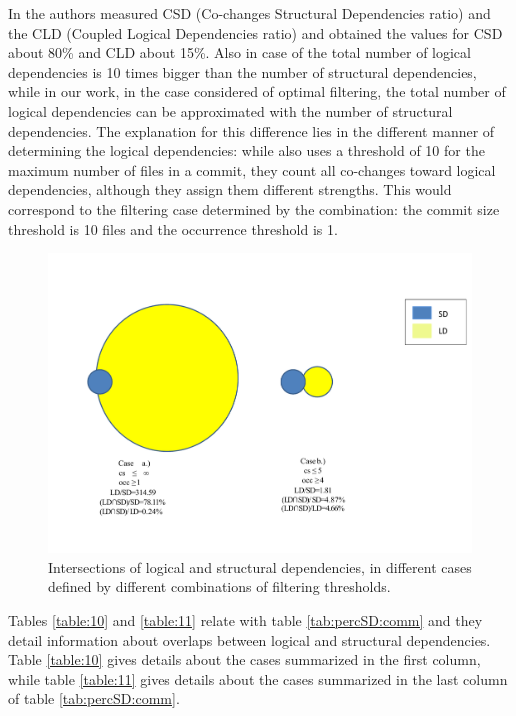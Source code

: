 \documentclass[a4paper,twoside]{article}
\begin{document}
In \cite{DBLP:journals/jss/AjienkaC17} the authors  measured CSD (Co-changes Structural Dependencies ratio) and the CLD (Coupled Logical Dependencies ratio) and obtained the values for CSD about 80\% and CLD about 15\%.  Also in case of \cite{DBLP:journals/jss/AjienkaC17}  the total number of logical dependencies is 10 times bigger than the number of structural dependencies, while in our work, in the case considered of optimal filtering,  the total number of logical dependencies can be approximated with the number of structural dependencies. The explanation for this difference lies in the different manner of determining the logical dependencies: while \cite{DBLP:journals/jss/AjienkaC17} also uses a threshold of 10 for the maximum number of files in a commit, they count all co-changes toward logical dependencies, although they assign them different strengths. This would correspond to the filtering case determined by the combination: the commit size threshold is 10 files and the occurrence threshold is 1. 


\begin{figure}[!t]
\centering
\includegraphics[width=5.7in]{figvenn-new.pdf}
\vspace{-1cm}
\caption{Intersections of logical and structural dependencies, in different cases defined by different combinations of filtering thresholds. }
\label{fig_venn}
\end{figure}




Tables \ref{table:10} and \ref{table:11} relate with table \ref{tab:percSD:comm} and they detail information about overlaps between logical and structural dependencies. Table \ref{table:10} gives details about the cases summarized in the first column, while table \ref{table:11} gives details about the cases summarized in the last column of table \ref{tab:percSD:comm}.
  
\end{document}
